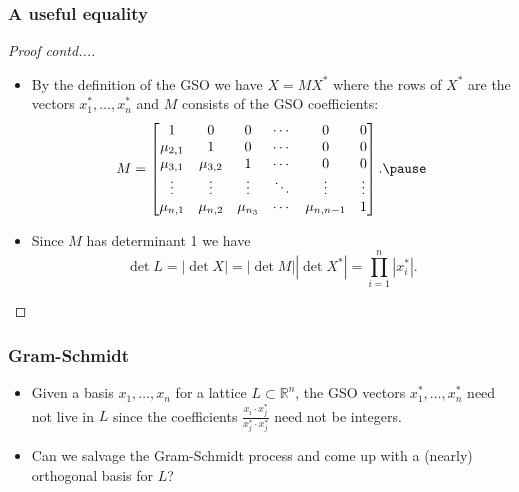 \documentclass{beamer}
\newcommand{\reals}{\mathbb{R}}
\begin{document}
\begin{frame}
	\frametitle{A useful equality}
	\begin{proof}[Proof contd...]
		\begin{itemize}
			\item By the definition of the GSO we have $X = MX^*$ where the rows of $X^*$ are the vectors $x_1^*, \ldots, x_n^*$ and $M$ consists of the GSO coefficients:
			\[
			M = \begin{bmatrix}
				1 & 0 & 0 & \cdots & 0 & 0\\
				\mu_{2,1} & 1 & 0 & \cdots & 0 & 0\\
				\mu_{3,1} & \mu_{3,2} & 1 & \cdots & 0 & 0\\
				\vdots & \vdots & \vdots & \ddots & \vdots & \vdots\\
				\mu_{n,1} & \mu_{n,2} & \mu_{n_3} & \cdots & \mu_{n,n-1} & 1
			\end{bmatrix}.\pause
			\]
			\item Since $M$ has determinant 1 we have
			\[
			\det L = |\det X| = |\det M||\det X^*| = \prod_{i=1}^n|x_i^*|.
			\]
		\end{itemize}
	\end{proof}
\end{frame}

\begin{frame}
	\frametitle{Gram-Schmidt}
	\begin{itemize}
		\item Given a basis $x_1, \ldots, x_n$ for a lattice $L\subset \reals^n$, the GSO vectors $x_1^*, \ldots, x_n^*$ need not live in $L$ since the coefficients $\frac{x_i\cdot x_j^*}{x_j^*\cdot x_j^*}$ need not be integers.\pause

		\item Can we salvage the Gram-Schmidt process and come up with a (nearly) orthogonal basis for $L$?
	\end{itemize}
\end{frame}

\end{document}
